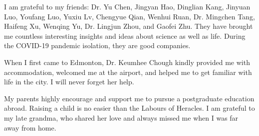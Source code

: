 I am grateful to my friends: Dr. Yu Chen, Jingyan Hao, Dinglian Kang, Jinyuan Luo, Youfang Luo, Yuxiu Lv, Chengyue Qian, Wenhui Ruan, Dr. Mingchen Tang, Haifeng Xu, Wenqing Yu, Dr. Lingjun Zhou, and Gaofei Zhu. They have brought me countless interesting insights and ideas about science as well as life. During the COVID-19 pandemic isolation, they are good companies.

When I first came to Edmonton, Dr. Keumhee Chough kindly provided me with accommodation, welcomed me at the airport, and helped me to get familiar with life in the city. I will never forget her help.

My parents highly encourage and support me to pursue a postgraduate education abroad. Raising a child is no easier than the Labours of Heracles. I am grateful to my late grandma, who shared her love and always missed me when I was far away from home.
